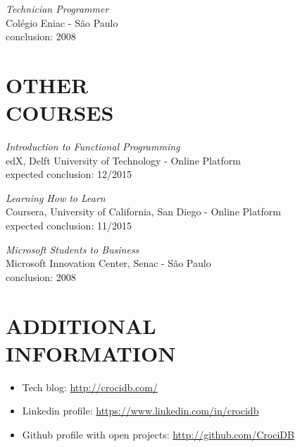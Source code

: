 \documentclass[line,margin]{res}
\begin{document}
\begin{resume}
			{\sl Technician Programmer} \\
	                Colégio Eniac - São Paulo \\
	                conclusion: 2008
                
\section{OTHER \\ COURSES}             
		   {\sl Introduction to Functional Programming} \\
			edX, Delft University of Technology - Online Platform \\
			expected conclusion: 12/2015

		   {\sl Learning How to Learn} \\
			Coursera, University of California, San Diego - Online Platform\\
			expected conclusion: 11/2015
		
           {\sl Microsoft Students to Business} \\
                Microsoft Innovation Center, Senac - São Paulo \\
                conclusion: 2008 

\section{ADDITIONAL \\ INFORMATION}
            \begin{itemize}  \itemsep 1pt
	    	\item Tech blog: \href{http://crocidb.com/}{http://crocidb.com/}
            \item Linkedin profile: \href{https://www.linkedin.com/in/crocidb}{https://www.linkedin.com/in/crocidb}
            \item Github profile with open projects: \href{http://github.com/CrociDB}{http://github.com/CrociDB}
            \end{itemize} 

\end{resume}
\end{document}
